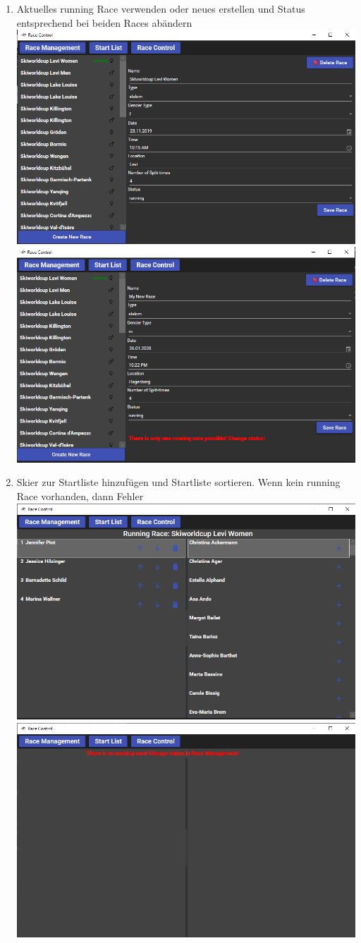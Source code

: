 \documentclass[a4paper, 12pt]{article}
\begin{document}
	\begin{enumerate}
		\item{Aktuelles running Race verwenden oder neues erstellen und Status entsprechend bei beiden Races abändern}
		\newline
		\includegraphics[width=.7\textwidth]{img/ui_raceManagement.png}
		\newline
		\includegraphics[width=.7\textwidth]{img/ui_raceManagement_create.png}
		\item{Skier zur Startliste hinzufügen und Startliste sortieren. Wenn kein running Race vorhanden, dann Fehler}
		\newline
		\includegraphics[width=.7\textwidth]{img/ui_startList.png}
		\newline
		\includegraphics[width=.7\textwidth]{img/ui_startList_no_race.png}

\end{enumerate}
\end{document}
